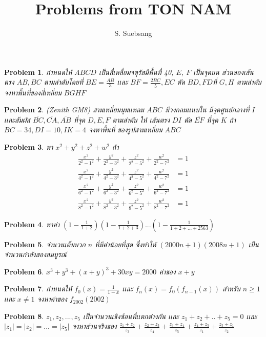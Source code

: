 \documentclass[a4paper,12pt]{article}
\author{S. Suebsang}
\title{\textbf{Problems from TON NAM}}
\newtheorem{problem}{Problem}
\begin{document}
	\maketitle
	\begin{problem}
		กำหนดให้ $ABCD$ เป็นสี่เหลี่ยมจตุรัสมีพื้นที่ 40, $E$, $F$ เป็นจุดบน ส่วนของเส้นตรง $AB,BC$ ตามลำดับโดยที่ $BE = \frac{AB}{3}$ เเละ $BF = \frac{2BC}{5}, EC$ ตัด $BD,FD$ที่ $G,H$ ตามลำดับ จงหาพื้นที่ของสี่เหลี่ยม $BGHF$
	\end{problem}
	\begin{problem}
		(Zenith GM8) สามเหลี่ยมมุมเเหลม $ABC$ มีวงกลมเเนบใน มีจุดศูนย์กลางที่ $I$ เเละสัมผัส $\overline{BC},\overline{CA},\overline{AB}$ ที่จุด $D,E,F$ ตามลำดับ ให้ เส้นตรง $DI$ ตัด $\overline{EF}$ ที่จุด $K$ ถ้า $BC = 34, DI = 10, IK = 4$ จงหาพื้นที่ ของรูปสามเหลี่ยม $ABC$
	\end{problem}
	\begin{problem}
		หา $x^2+y^2+z^2+w^2$ ถ้า
		\begin{align*}
		\frac{x^2}{2^2-1^2} + \frac{y^2}{2^2-3^2} + \frac{z^2}{2^2-5^2} + \frac{w^2}{2^2-7^2} &= 1 \\
		\frac{x^2}{4^2-1^2} + \frac{y^2}{4^2-3^2} + \frac{z^2}{4^2-5^2} + \frac{w^2}{4^2-7^2} &= 1 \\
		\frac{x^2}{6^2-1^2} + \frac{y^2}{6^2-3^2} + \frac{z^2}{6^2-5^2} + \frac{w^2}{6^2-7^2} &= 1 \\
		\frac{x^2}{8^2-1^2} + \frac{y^2}{8^2-3^2} + \frac{z^2}{8^2-5^2} + \frac{w^2}{8^2-7^2} &= 1 		
		\end{align*}
	\end{problem}
	\begin{problem}
		หาค่า $(1-\frac{1}{1+2})(1-\frac{1}{1+2+3})...(1-\frac{1}{1+2+...+2563})$
	\end{problem}
	\begin{problem}
		จำนวนเต็มบวก $n$ ที่มีค่าน้อยที่สุด ซึ่งทำให้ $(2000n+1)(2008n+1)$ เป็นจำนวนกำลังสองสมบูรณ์
	\end{problem}
	\begin{problem}
		$x^3 + y^3 + (x + y)^3 + 30xy = 2000$ ค่าของ $x + y$
	\end{problem}
	\begin{problem}
		กำหนดให้ $f_0(x) = \frac{1}{1 - x}$ เเละ  $f_n(x) = f_0(f_{n-1}(x))$ สำหรับ $n \ge 1$ เเละ $x \ne 1$ จงหาค่าของ $f_{2002}(2002)$
	\end{problem}
	\begin{problem}
		$z_1,z_2,...,z_5$ เป็นจำนวนเชิงซ้อนที่เเตกต่างกัน เเละ $z_1+z_2+..+z_5 = 0$ เเละ $|z_1|=|z_2|=...=|z_5|$ จงหาส่วนจริงของ $\frac{z_1+z_2}{z_3}+\frac{z_2+z_3}{z_4}+\frac{z_3+z_4}{z_5}+\frac{z_4+z_5}{z_1}+\frac{z_5+z_1}{z_2}$
	\end{problem}
\end{document}
